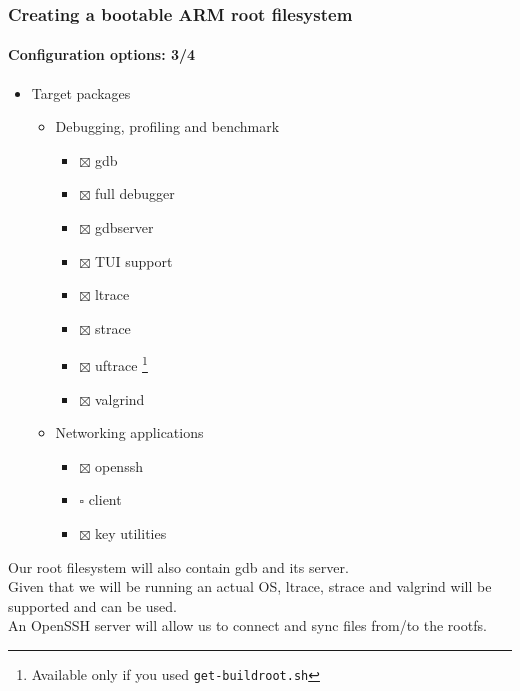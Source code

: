 \begin{frame}
  \frametitle{Creating a bootable ARM root filesystem}
  \framesubtitle{Configuration options: 3/4}
  \begin{itemize}
    \item Target packages
    \begin{itemize}
      \item Debugging, profiling and benchmark
      \begin{itemize}
        \item $\boxtimes$ gdb
        \item $\boxtimes$ full debugger
        \item $\boxtimes$ gdbserver
        \item $\boxtimes$ TUI support
        \item $\boxtimes$ ltrace
        \item $\boxtimes$ strace
        \item $\boxtimes$ uftrace \footnote{Available only if you used \texttt{get-buildroot.sh}}
        \item $\boxtimes$ valgrind
      \end{itemize}
      \item Networking applications
      \begin{itemize}
        \item $\boxtimes$ openssh
        \item $\square$ client
        \item $\boxtimes$ key utilities
      \end{itemize}
    \end{itemize}
  \end{itemize}
\end{frame}
 {
  Our root filesystem will also contain gdb and its server. \\
  Given that we will be running an actual OS, ltrace, strace and valgrind will be supported and can be used. \\
  An OpenSSH server will allow us to connect and sync files from/to the rootfs.
}

